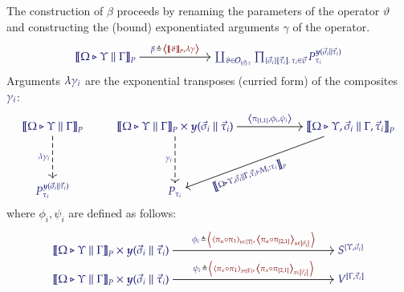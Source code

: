 \documentclass[11pt]{article}
\theoremstyle{definition}
\theoremstyle{remark}
\numberwithin{equation}{section}
\def\IModeColorName{MidnightBlue}
\def\OModeColorName{Maroon}
\newcommand\IMode[1]{{\color{\IModeColorName}{#1}}}
\newcommand\OMode[1]{{\color{\OModeColorName}{#1}}}
\newcommand\MkValence[3]{%
  \ifthenelse{\equal{#1}{}}{}{%
    \{#1\}%
  }%
  \ifthenelse{\equal{#2}{}}{}{%
    [#2]%
  }.\, #3%
}
\newcommand\MkArity[2]{(#1)\, #2}
\newcommand\Operators{\mathcal{O}}
\newcommand\Pair[2]{\left\langle\,#1,#2\,\right\rangle}
\newcommand\Tuple[1]{\left\langle#1 \right\rangle}
\newcommand\Dom[1]{\left\vert#1\right\vert}
\newcommand\Define[2]{\IMode{#1}\triangleq\OMode{#2}}
\newcommand\SemBrackets[1]{\left\llbracket#1\right\rrbracket}
\newcommand\Yoneda[1]{\boldsymbol{y} (#1)}
\begin{document}
The construction of $\beta$ proceeds by renaming the parameters of the operator
$\vartheta$ and constructing the (bound) exponentiated arguments $\gamma$ of the
operator.
\[
  \begin{tikzcd}[cramped, ampersand replacement = \&]
    {\IMode{\SemBrackets{\Omega\triangleright\Upsilon\parallel\Gamma}_P}}
       \arrow[r, "\Define{\beta\,}{\,\Tuple{\SemBrackets{\vartheta}_P, \lambda\gamma}}"]
    \&[4.0em] {\IMode{%
       \coprod_{\vartheta\in \Operators_{\MkArity{\vec{v}}{\tau}}}%
       \prod_{\MkValence{\vec{\sigma}_i}{\vec{\tau}_i}{\tau_i}\in\vec{v}}%
       P_{\tau_i}^{\Yoneda{\vec{\sigma}_i\parallel\vec{\tau}_i}}%
    }}
  \end{tikzcd}
\]
Arguments $\lambda\IMode{{\gamma}_{i}}$ are the exponential transposes (curried
form) of the composites $\IMode{{\gamma}_{i}}$:
\[
  \begin{tikzcd}[cramped, ampersand replacement = \&]
    {\IMode{\SemBrackets{\Omega\triangleright\Upsilon\parallel\Gamma}_{P}}}
      \arrow[d, dashed, swap, "\IMode{\lambda{\gamma}_{i}}"]
    \&
    {\IMode{\SemBrackets{\Omega\triangleright\Upsilon\parallel\Gamma}_{P}
       \times\Yoneda{\vec{\sigma}_{i}\parallel\vec{\tau}_{i}}}
    }
      \arrow[r, "\IMode{\Tuple{{\pi}_{[1,1]},{\phi}_{i},{\psi}_{i}}}"]
      \arrow[d, dashed, swap, "\IMode{{\gamma}_{i}}"]
    \&[3.5em]
    {\IMode{\SemBrackets{\Omega\triangleright\Upsilon,\vec{\sigma}_i\parallel\Gamma,\vec{\tau}_{i}}_{P}}}
      \ar{dl}[
        , rotate = +19.25
        , xshift = -4.5em
        , yshift = -0.2em
      ]{\IMode{\SemBrackets{\Omega\triangleright\Upsilon,\vec{\sigma}_{i}\parallel\Gamma,\vec{\tau}_{i}\vdash M_i:\tau_i}_P}}
    \\[2.0em]
    {\IMode{{P}_{{\tau}_{i}}^{\Yoneda{\vec{\sigma}_{i}\parallel\vec{\tau}_{i}}}}}
    \& {\IMode{P_{{\tau}_{i}}}}
    \&
  \end{tikzcd}
\]
where $\phi_i,\psi_i$ are defined as follows:
\begin{gather*}
  \begin{tikzcd}[cramped, ampersand replacement = \&]
    {\IMode{\SemBrackets{\Omega\triangleright\Upsilon\parallel\Gamma}_P
       \times\Yoneda{\vec{\sigma}_i\parallel\vec{\tau}_i}
    }}
      \arrow[r, "\Define{\phi_i\,}{\,\Pair{\Tuple{\pi_u\circ\pi_1}_{u\in\Dom{\Upsilon}}}{\,\Tuple{\pi_u\circ\pi_{[2,1]}}_{u\in\Dom{\vec{\sigma}_i}}}}"]
    \&[12.0em] {\IMode{S^{\{\Upsilon,\vec{\sigma}_i\}}}}\\[-1.0em]
    {\IMode{\SemBrackets{\Omega\triangleright\Upsilon\parallel\Gamma}_P
       \times\Yoneda{\vec{\sigma}_i\parallel\vec{\tau}_i}
    }}
      \arrow[r, "\Define{\psi_i\,}{\,\Pair{\Tuple{\pi_x\circ\pi_1}_{x\in\Dom{\Gamma}}}{\,\Tuple{\pi_x\circ\pi_{[2,1]}}_{x\in\Dom{\vec{\tau}_i}}}}"]
    \&[12.0em] {\IMode{V^{[\Gamma,\vec{\tau}_i]}}}
  \end{tikzcd}
\end{gather*}
\end{document}

